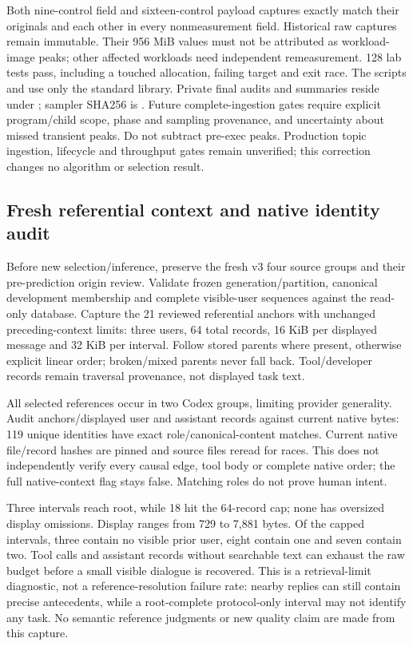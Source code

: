 \documentclass[11pt]{article}
\begin{document}
Both nine-control field and sixteen-control payload captures exactly match
their originals and each other in every nonmeasurement field. Historical raw
captures remain immutable. Their 956 MiB values must not be attributed as
workload-image peaks; other affected workloads need independent remeasurement.
128 lab tests pass, including a touched allocation, failing target and exit race.
The scripts  and  use only the
standard library. Private final audits and summaries reside under
; sampler SHA256 is
.
Future complete-ingestion gates require explicit program/child scope, phase and
sampling provenance, and uncertainty about missed transient peaks. Do not subtract
pre-exec peaks. Production topic ingestion, lifecycle and throughput gates remain
unverified; this correction changes no algorithm or selection result.

\subsection{Fresh referential context and native identity audit}
Before new selection/inference, preserve the fresh v3 four source groups and
their pre-prediction origin review. Validate frozen generation/partition,
canonical development membership and complete visible-user sequences against the
read-only database. Capture the 21 reviewed referential anchors with unchanged
preceding-context limits: three users, 64 total records, 16 KiB per displayed
message and 32 KiB per interval. Follow stored parents where present, otherwise
explicit linear order; broken/mixed parents never fall back. Tool/developer
records remain traversal provenance, not displayed task text.

All selected references occur in two Codex groups, limiting provider generality.
Audit anchors/displayed user and assistant records against current native bytes:
119 unique identities have exact role/canonical-content matches. Current native
file/record hashes are pinned and source files reread for races. This does not
independently verify every causal edge, tool body or complete native order; the
full native-context flag stays false. Matching roles do not prove human intent.

Three intervals reach root, while 18 hit the 64-record cap; none has oversized
display omissions. Display ranges from 729 to 7,881 bytes. Of the capped intervals,
three contain no visible prior user, eight contain one and seven contain two.
Tool calls and assistant records without searchable text can exhaust the raw
budget before a small visible dialogue is recovered. This is a retrieval-limit
diagnostic, not a reference-resolution failure rate: nearby replies can still
contain precise antecedents, while a root-complete protocol-only interval may
not identify any task. No semantic reference judgments or new quality claim
are made from this capture.
\end{document}

